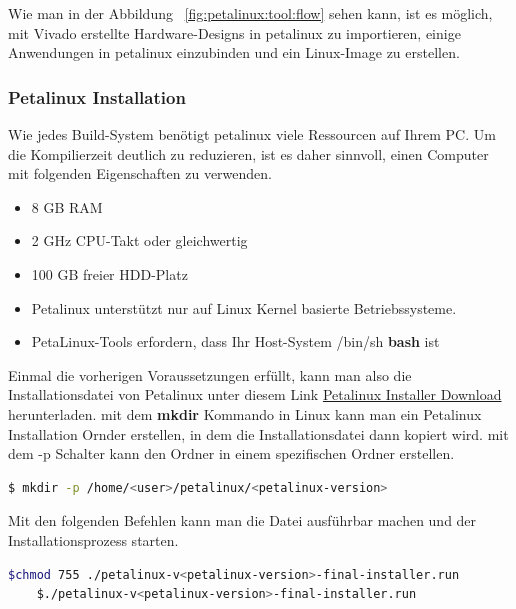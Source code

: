 Wie man in der Abbildung ~\ref{fig:petalinux:tool:flow} sehen kann, ist es möglich, mit Vivado erstellte Hardware-Designs in petalinux zu importieren, einige Anwendungen in petalinux einzubinden und ein Linux-Image zu erstellen.  

\subsubsection{Petalinux Installation}
Wie jedes Build-System benötigt petalinux viele Ressourcen auf Ihrem PC. Um die Kompilierzeit deutlich zu reduzieren, ist es daher sinnvoll, einen Computer mit folgenden Eigenschaften zu verwenden.\cite{Xilinx2020}

\begin{itemize}
	\item 8 GB RAM
	\item 2 GHz CPU-Takt oder gleichwertig
	\item 100 GB freier HDD-Platz
	\item Petalinux unterstützt nur auf Linux Kernel basierte Betriebssysteme. 
	\item PetaLinux-Tools erfordern, dass Ihr Host-System /bin/sh \textbf{bash} ist
\end{itemize}

 Einmal die vorherigen Voraussetzungen erfüllt, kann man also die Installationsdatei von Petalinux unter diesem Link \href{https://www.xilinx.com/support/download/index.html/content/xilinx/en/downloadNav/embedded-design-tools.html}{Petalinux Installer Download}  herunterladen. 
 mit dem \textbf{mkdir} Kommando in Linux kann man ein Petalinux Installation Ornder erstellen, in dem die Installationsdatei dann kopiert wird. mit dem -p Schalter kann den Ordner in einem spezifischen Ordner erstellen.\\
 
\begin{lstlisting}[language=bash]
 	$ mkdir -p /home/<user>/petalinux/<petalinux-version>
\end{lstlisting}

Mit den folgenden Befehlen kann man die Datei ausführbar machen und der Installationsprozess starten.
\begin{lstlisting}[language=bash]
 	$chmod 755 ./petalinux-v<petalinux-version>-final-installer.run
	$./petalinux-v<petalinux-version>-final-installer.run
\end{lstlisting}

